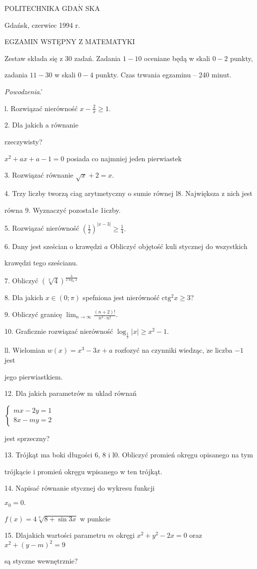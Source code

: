 \documentclass[a4paper,12pt]{article}
\begin{document}
POLITECHNIKA $\mathrm{G}\mathrm{D}\mathrm{A}\acute{\mathrm{N}}$ SKA

Gdańsk, czerwiec 1994 r.

EGZAMIN WSTĘPNY Z MATEMATYKI

Zestaw składa się z 30 zadań. Zadania $1-10$ oceniane będą w skali $0-2$ punkty,

zadania $11-30$ w skali $0-4$ punkty. Czas trwania egzaminu -- 240 minut.

{\it Powodzenia}.'

l. Rozwiązać nierówność $x-\displaystyle \frac{2}{x}\geq 1.$

2. Dla jakich a równanie

rzeczywisty?

$x^{2}+ax+a-1=0$ posiada co najmniej jeden pierwiastek

3. Rozwiązać równanie $\sqrt{x}+2=x.$

4. Trzy liczby tworzą ciag arytmetyczny o sumie równej l8. Największa z nich jest

równa 9. Wyznaczyć pozosta1e 1iczby.

5. Rozwiązać nierówność $(\displaystyle \frac{1}{2})^{|x-3|}\geq\frac{1}{4}.$

6. Dany jest sześcian o krawędzi $a$ Obliczyć objętość kuli stycznej do wszystkich

krawędzi tego sześcianu.

7. Obliczyć $(\sqrt[3]{4})^{\frac{3}{2\log_{3}2}}$

8. Dla jakich $x\in(0;\pi)$ spefniona jest nierówność $\mathrm{c}\mathrm{t}\mathrm{g}^{2}x\geq 3$?

9. Obliczyć granicę $\displaystyle \lim_{n\rightarrow\infty}\frac{(n+2)!}{n^{2}\cdot n!}.$

10. Graficznie rozwiązać nierówność $\log_{\frac{1}{2}}|x|\geq x^{2}-1.$

ll. Wielomian $w(x)=x^{3}-3x+a$ rozfozyć na czynniki wiedząc, $\dot{\mathrm{z}}\mathrm{e}$ liczba $-1$ jest

jego pierwiastkiem.

12. Dla jakich parametrów m uklad równań

$\left\{\begin{array}{l}
mx-2y=1\\
8x-my=2
\end{array}\right.$

jest sprzeczny?

13. Trójkąt ma boki długości 6, 8 i l0. Obliczyć promień okręgu opisanego na tym

trójkącie i promień okręgu wpisanego w ten trójkąt.

14. Napisać równanie stycznej do wykresu funkcji

$x_{0}=0.$

$f(x)=4\sqrt[3]{8+\sin 3x}$ w punkcie

15. Dlajakich wartości parametru $m$ okręgi $x^{2}+y^{2}-2x=0$ oraz $x^{2}+(y-m)^{2}=9$

są styczne wewnętrznie?
\end{document}

